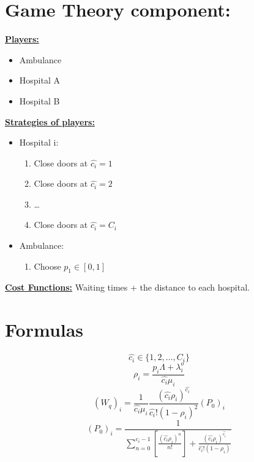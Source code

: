 \documentclass{article}
\begin{document}
\newpage

\section{Game Theory component:} 
\textbf{\underline{Players:}} 
\begin{itemize}
    \item Ambulance
    \item Hospital A
    \item Hospital B
\end{itemize}

\noindent 
\textbf{\underline{Strategies of players:}}
\begin{itemize}
    \item Hospital i:    
    \begin{enumerate} 
        \item Close doors at \(\hat{c_i} = 1\) 
        \item Close doors at \(\hat{c_i} = 2\)
        \item \dots
        \item Close doors at \(\hat{c_i} = C_i\)
    \end{enumerate}
    \item Ambulance:
    \begin{enumerate}
        \item Choose \(p_1 \in [0,1]\) 
    \end{enumerate}
\end{itemize}

\noindent 
\textbf{\underline{Cost Functions:}} Waiting times + the distance to each hospital. 









\section{Formulas}
\[ \hat{c_i} \in \{1,2, \dots, C_i\} \]
\[ \rho_i = \frac{p_i \Lambda + \lambda_i^o}{\hat{c_i}\mu_i} \]
\[ (W_q)_i = \frac{1}{\hat{c_i} \mu_i} \frac{(\hat{c_i} \rho_i)^{\hat{c_i}}}{\hat{c_i}!(1-\rho_i)^2}(P_0)_i \]
\[ (P_0)_i = \frac{1}{\sum_{n = 0}^{\hat{c_i} - 1} \left[ \frac{(\hat{c_i} \rho_i)^n}{n!} \right] + \frac{(\hat{c_i}\rho_i)^{\hat{c_i}}}{\hat{c_i}!(1-\rho_i)}} \]
\end{document}
